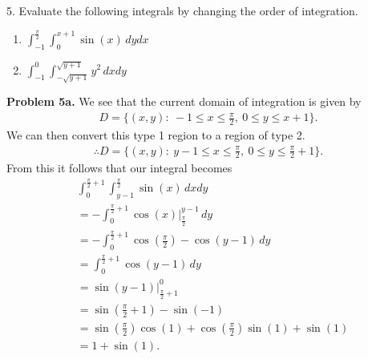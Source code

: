 \documentclass{report}
\begin{document}
    \bigbreak \noindent 
    \begin{mdframed}
        5. Evaluate the following integrals by changing the order of integration.
        \begin{enumerate}[label=(\alph*)]
            \item $\int_{-1}^{\frac{\pi}{2}}\int_{0}^{x+1}  \sin{\left(x\right)}\,dydx  $
            \item $\int_{-1}^{0}\int_{-\sqrt{y+1}}^{\sqrt{y+1}}  y^{2}\,dxdy $
        \end{enumerate}
    \end{mdframed}
    \bigbreak \noindent 
    \textbf{Problem 5a.} We see that the current domain of integration is given by
    \begin{align*}
        D = \{(x,y):\ -1 \leq x \leq\frac{\pi}{2},\ 0 \leq y \leq x+1\}
    .\end{align*}
    We can then convert this type 1 region to a region of type 2.
    \begin{align*}
        \therefore D = \{(x,y):\ y-1 \leq x \leq \frac{\pi}{2},\ 0 \leq y \leq \frac{\pi}{2} + 1\}
    .\end{align*}
    From this it follows that our integral becomes
    \begin{align*}
        &\int_{0}^{\frac{\pi}{2}+1}\int_{y-1}^{\frac{\pi}{2}}  \sin{\left(x\right)}\, dxdy \\
        &=-\int_{0}^{\frac{\pi}{2}+1}  \cos{\left(x\right)}\bigg|^{y-1}_{\frac{\pi}{2}}\, dy \\
        &=-\int_{0}^{\frac{\pi}{2}+1}  \cos{\left(\frac{\pi}{2} \right)} - \cos{\left(y-1\right)}\, dy \\
        &=\int_{0}^{\frac{\pi}{2}+1}  \cos{\left(y-1\right)}\, dy \\
        &=\sin{\left(y-1\right)}\bigg|^{0}_{\frac{\pi}{2}+1} \\
        &=\sin{\left(\frac{\pi}{2}+1\right)} - \sin{\left(-1\right)} \\
        &=\sin{\left(\frac{\pi}{2}\right)}\cos{\left(1\right)}+\cos{\left(\frac{\pi}{2}\right)}\sin{\left(1\right)} + \sin{\left(1\right)} \\
        &=1 + \sin{\left(1\right)}
    .\end{align*}
\end{document}
